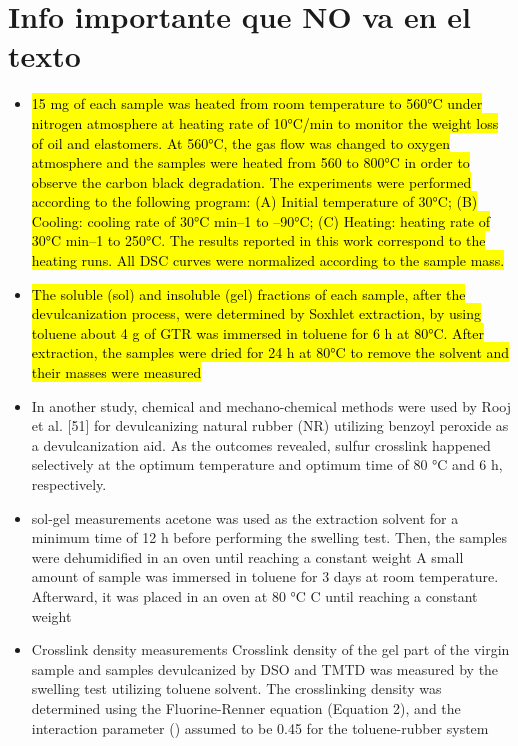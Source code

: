 \chapter{Info importante que NO va en el texto}

\begin{itemize}
    \item \hl{15 mg of each sample was heated from room temperature
to 560°C under nitrogen atmosphere at
heating rate of 10°C/min to monitor the weight loss
of oil and elastomers. At 560°C, the gas flow was
changed to oxygen atmosphere and the samples
were heated from 560 to 800°C in order to observe
the carbon black degradation. The experiments were performed
according to the following program: (A) Initial temperature
of 30°C; (B) Cooling: cooling rate of
30°C min–1 to –90°C; (C) Heating: heating rate of
30°C min–1 to 250°C. The results reported in this
work correspond to the heating runs. All DSC curves
were normalized according to the sample mass.}

\item \hl{The soluble (sol) and insoluble (gel) fractions of
each sample, after the devulcanization process, were
determined by Soxhlet extraction, by using toluene
about 4 g of GTR was immersed in toluene for
6 h at 80°C. After extraction, the samples were
dried for 24 h at 80°C to remove the solvent and
their masses were measured}

\item In another study,
chemical and mechano-chemical methods were used by Rooj et al. [51] for devulcanizing natural
rubber (NR) utilizing benzoyl peroxide as a devulcanization aid. As the outcomes revealed, sulfur
crosslink happened selectively at the optimum temperature and optimum time of 80 °C and 6 h,
respectively. 

\item sol-gel measurements
acetone was used as the extraction solvent for a minimum time of 12 h before performing
the swelling test. Then, the samples were dehumidified in an oven until reaching a constant weight A small amount of sample was immersed in toluene for 3 days at room temperature.
Afterward, it was placed in an oven at 80 \unit{\degreeCelsius} C until reaching a constant weight


\item Crosslink density measurements
Crosslink density of the gel part of the virgin sample and samples devulcanized by DSO and
TMTD was measured by the swelling test utilizing toluene solvent. The crosslinking density was
determined using the Fluorine-Renner equation (Equation 2), and the interaction parameter ()
assumed to be 0.45 for the toluene-rubber system


\end{itemize}
